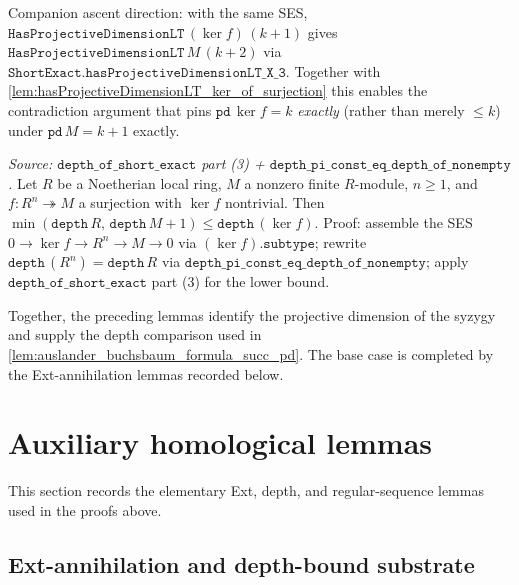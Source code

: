 \begin{lemma}\leanok
  \label{lem:hasProjectiveDimensionLT_succ_of_hasProjectiveDimensionLT_ker}
  Companion ascent direction: with the same SES,
  \(\texttt{HasProjectiveDimensionLT}\,(\ker f)\,(k+1)\) gives
  \(\texttt{HasProjectiveDimensionLT}\,M\,(k+2)\) via
  \(\texttt{ShortExact.hasProjectiveDimensionLT\_X\_3}\). Together with
  \ref{lem:hasProjectiveDimensionLT_ker_of_surjection} this enables the
  contradiction argument that pins \(\texttt{pd}\,\ker f = k\)
  \emph{exactly} (rather than merely \(\leq k\)) under
  \(\texttt{pd}\,M = k+1\) exactly.
\end{lemma}
\begin{lemma}
  \label{lem:depth_ker_ge_min_of_surjection_finite_localRing}
  \textit{Source: \(\texttt{depth\_of\_short\_exact}\) part (3) +
  \(\texttt{depth\_pi\_const\_eq\_depth\_of\_nonempty}\).}
  Let \(R\) be a Noetherian local ring, \(M\) a nonzero finite
  \(R\)-module, \(n \geq 1\), and \(f : R^n \twoheadrightarrow M\) a
  surjection with \(\ker f\) nontrivial. Then
  \(\min(\texttt{depth}\,R,\, \texttt{depth}\,M + 1) \leq
   \texttt{depth}\,(\ker f)\).
  Proof: assemble the SES \(0 \to \ker f \to R^n \to M \to 0\) via
  \((\ker f).\texttt{subtype}\); rewrite
  \(\texttt{depth}\,(R^n) = \texttt{depth}\,R\) via
  \(\texttt{depth\_pi\_const\_eq\_depth\_of\_nonempty}\); apply
  \(\texttt{depth\_of\_short\_exact}\) part (3) for the lower bound.
\end{lemma}

Together, the preceding lemmas identify the projective dimension of the
syzygy and supply the depth comparison used in
\cref{lem:auslander_buchsbaum_formula_succ_pd}. The base case is completed
by the Ext-annihilation lemmas recorded below.
\section{Auxiliary homological lemmas}
\label{sec:ab_substrate_helpers}

This section records the elementary Ext, depth, and regular-sequence lemmas
used in the proofs above.

\subsection{Ext-annihilation and depth-bound substrate}
\label{subsec:ab_ext_depth_substrate}

